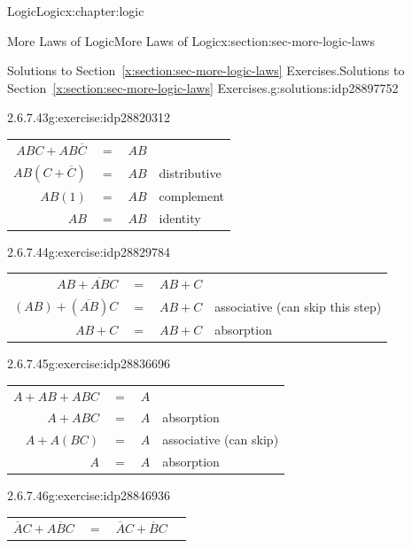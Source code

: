 \documentclass[twoside,10pt,]{book}
\newcommand{\tabularfont}{\relax}
\newcommand{\xreffont}{\relax}
\numberwithin{equation}{section}
\begin{document}
\begin{chapterptx}{Logic}{}{Logic}{}{}{x:chapter:logic}
\begin{sectionptx}{More Laws of Logic}{}{More Laws of Logic}{}{}{x:section:sec-more-logic-laws}
\begin{solutions-subsection}{Solutions to Section~{\xreffont\ref*{x:section:sec-more-logic-laws}} Exercises.}{}{Solutions to Section~{\xreffont\ref*{x:section:sec-more-logic-laws}} Exercises.}{}{}{g:solutions:idp28897752}
\begin{exercisegroup}
\begin{divisionsolutioneg}{2.6.7.43}{}{g:exercise:idp28820312}
\noindent\hypertarget{g:solution:idp28822872-main}{}\begin{center}%
{\tabularfont%
\begin{tabular}{llll}
\multicolumn{1}{r}{\(ABC+AB\overline{C}{}\)}&\(=\)&\(AB\)&\tabularnewline[0pt]
\multicolumn{1}{r}{\(AB(C+\overline{C}{})\)}&\(=\)&\(AB\)&distributive\tabularnewline[0pt]
\multicolumn{1}{r}{\(AB(1)\)}&\(=\)&\(AB\)&complement\tabularnewline[0pt]
\multicolumn{1}{r}{\(AB\)}&\(=\)&\(AB\)&identity
\end{tabular}
}%
\end{center}%
\end{divisionsolutioneg}%
\begin{divisionsolutioneg}{2.6.7.44}{}{g:exercise:idp28829784}%
\par\smallskip%
\noindent\hypertarget{g:solution:idp28833752-main}{}\begin{center}%
{\tabularfont%
\begin{tabular}{llll}
\multicolumn{1}{r}{\(AB+\overline{AB}C\)}&\(=\)&\(AB+C\)&\tabularnewline[0pt]
\multicolumn{1}{r}{\((AB)+(\overline{AB})C\)}&\(=\)&\(AB+C\)&associative (can skip this step)\tabularnewline[0pt]
\multicolumn{1}{r}{\(AB+C\)}&\(=\)&\(AB+C\)&absorption
\end{tabular}
}%
\end{center}%
\end{divisionsolutioneg}%
\begin{divisionsolutioneg}{2.6.7.45}{}{g:exercise:idp28836696}%
\par\smallskip%
\noindent\hypertarget{g:solution:idp28840408-main}{}\begin{center}%
{\tabularfont%
\begin{tabular}{llll}
\multicolumn{1}{r}{\(A+AB+ABC\)}&\(=\)&\(A\)&\tabularnewline[0pt]
\multicolumn{1}{r}{\(A+ABC\)}&\(=\)&\(A\)&absorption\tabularnewline[0pt]
\multicolumn{1}{r}{\(A+A(BC)\)}&\(=\)&\(A\)&associative (can skip)\tabularnewline[0pt]
\multicolumn{1}{r}{\(A\)}&\(=\)&\(A\)&absorption
\end{tabular}
}%
\end{center}%
\end{divisionsolutioneg}%
\begin{divisionsolutioneg}{2.6.7.46}{}{g:exercise:idp28846936}%
\par\smallskip%
\noindent\hypertarget{g:solution:idp28855896-main}{}\begin{center}%
{\tabularfont%
\begin{tabular}{llll}
\multicolumn{1}{r}{\(\overline{A}{}C+A\overline{B}{}C\)}&\(=\)&\(\overline{A}{}C+\overline{B}{}C\)&\tabularnewline[0pt]

\end{tabular}}
\end{center}
\end{divisionsolutioneg}
\end{exercisegroup}
\end{solutions-subsection}
\end{sectionptx}
\end{chapterptx}
\end{document}

